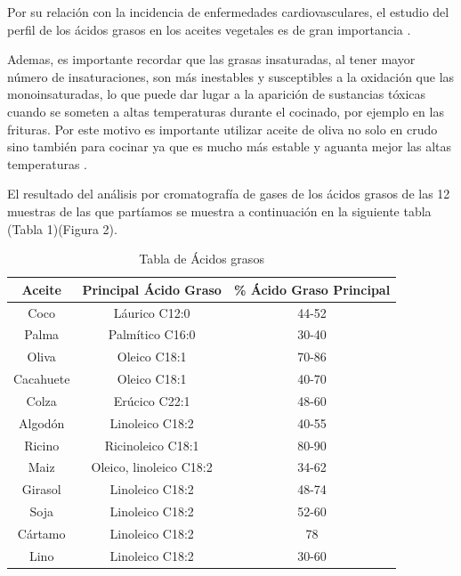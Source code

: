 \documentclass[a4paper,12pt]{article}
\begin{document}
\begin{multicols}{2}
Por su relación con la incidencia de enfermedades cardiovasculares, el estudio del perfil de los ácidos grasos en los aceites vegetales es de gran importancia \cite{Ucciani1994}. 

Ademas, es importante recordar que las grasas insaturadas, al tener mayor número de insaturaciones, son más inestables y susceptibles a la oxidación que las monoinsaturadas, lo que puede dar lugar a la aparición de sustancias tóxicas cuando se someten a altas temperaturas durante el cocinado, por ejemplo en las frituras. Por este motivo es importante utilizar aceite de oliva no solo en crudo sino también para cocinar ya que es mucho más estable y aguanta mejor las altas temperaturas \cite{Balaciano}.

El resultado del análisis por cromatografía de gases de los  ácidos grasos de las 12 muestras de las que partíamos se muestra a continuación en la siguiente tabla (Tabla 1)(Figura 2).

\end{multicols}

\begin{table}[H]
\centering
\begin{tabular}{|c|c|c|}
\hline

Aceite & Principal Ácido Graso & \% Ácido Graso Principal\\
\hline
Coco & Láurico C12:0 & 44-52\\
\hline
Palma & Palmítico C16:0 & 30-40\\
\hline
Oliva & Oleico C18:1 & 70-86\\
\hline
Cacahuete & Oleico C18:1 & 40-70\\
\hline
Colza & Erúcico C22:1 & 48-60\\
\hline
Algodón & Linoleico C18:2 & 40-55\\
\hline
Ricino & Ricinoleico C18:1 & 80-90\\
\hline
Maiz & Oleico, linoleico C18:2 & 34-62\\
\hline
Girasol & Linoleico C18:2 & 48-74\\
\hline
Soja & Linoleico C18:2 & 52-60\\
\hline
Cártamo & Linoleico C18:2 & 78\\
\hline
Lino & Linoleico C18:2 & 30-60\\
\hline

\end{tabular}
\caption{Tabla de Ácidos grasos}
\label{tb: Tabla 1}
\end{table}
\end{document}
